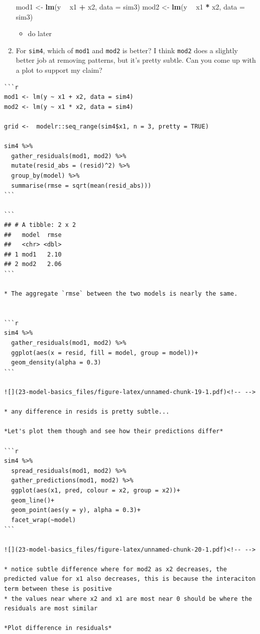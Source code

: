 \documentclass[]{book}
\newenvironment{Shaded}{\begin{snugshade}}{\end{snugshade}}
\newcommand{\DataTypeTok}[1]{\textcolor[rgb]{0.13,0.29,0.53}{#1}}
\newcommand{\KeywordTok}[1]{\textcolor[rgb]{0.13,0.29,0.53}{\textbf{#1}}}
\newcommand{\NormalTok}[1]{#1}
\newcommand{\OperatorTok}[1]{\textcolor[rgb]{0.81,0.36,0.00}{\textbf{#1}}}
\newcommand{\StringTok}[1]{\textcolor[rgb]{0.31,0.60,0.02}{#1}}
\providecommand{\tightlist}{%
  \setlength{\itemsep}{0pt}\setlength{\parskip}{0pt}}
\theoremstyle{definition}
\theoremstyle{definition}
\theoremstyle{definition}
\theoremstyle{remark}
\begin{document}
\begin{enumerate}
\begin{Shaded}
\begin{Highlighting}[]
\NormalTok{mod1 <-}\StringTok{ }\KeywordTok{lm}\NormalTok{(y }\OperatorTok{~}\StringTok{ }\NormalTok{x1 }\OperatorTok{+}\StringTok{ }\NormalTok{x2, }\DataTypeTok{data =}\NormalTok{ sim3)}
\NormalTok{mod2 <-}\StringTok{ }\KeywordTok{lm}\NormalTok{(y }\OperatorTok{~}\StringTok{ }\NormalTok{x1 }\OperatorTok{*}\StringTok{ }\NormalTok{x2, }\DataTypeTok{data =}\NormalTok{ sim3)}
\end{Highlighting}
\end{Shaded}

  \begin{itemize}
  \tightlist
  \item
    do later
  \end{itemize}
\item
  For \texttt{sim4}, which of \texttt{mod1} and \texttt{mod2} is better?
  I think \texttt{mod2} does a slightly better job at removing patterns,
  but it's pretty subtle. Can you come up with a plot to support my
  claim?
\end{enumerate}

\begin{verbatim}
```r
mod1 <- lm(y ~ x1 + x2, data = sim4)
mod2 <- lm(y ~ x1 * x2, data = sim4)

grid <-  modelr::seq_range(sim4$x1, n = 3, pretty = TRUE)

sim4 %>% 
  gather_residuals(mod1, mod2) %>% 
  mutate(resid_abs = (resid)^2) %>% 
  group_by(model) %>% 
  summarise(rmse = sqrt(mean(resid_abs)))
```

```
## # A tibble: 2 x 2
##   model  rmse
##   <chr> <dbl>
## 1 mod1   2.10
## 2 mod2   2.06
```

* The aggregate `rmse` between the two models is nearly the same.


```r
sim4 %>% 
  gather_residuals(mod1, mod2) %>% 
  ggplot(aes(x = resid, fill = model, group = model))+
  geom_density(alpha = 0.3)
```

![](23-model-basics_files/figure-latex/unnamed-chunk-19-1.pdf)<!-- --> 

* any difference in resids is pretty subtle...

*Let's plot them though and see how their predictions differ*

```r
sim4 %>% 
  spread_residuals(mod1, mod2) %>% 
  gather_predictions(mod1, mod2) %>% 
  ggplot(aes(x1, pred, colour = x2, group = x2))+
  geom_line()+
  geom_point(aes(y = y), alpha = 0.3)+
  facet_wrap(~model)
```

![](23-model-basics_files/figure-latex/unnamed-chunk-20-1.pdf)<!-- --> 

* notice subtle difference where for mod2 as x2 decreases, the predicted value for x1 also decreases, this is because the interaciton term between these is positive
* the values near where x2 and x1 are most near 0 should be where the residuals are most similar

*Plot difference in residuals*
\end{verbatim}
\end{document}
